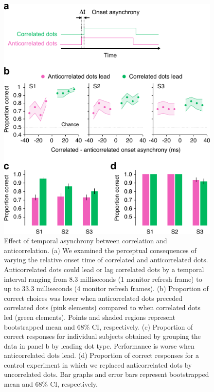\begin{figure}
  \centering
  \includegraphics{Fig6}
  \caption[Effect of temporal asynchrony between correlation and anticorrelation.]{Effect of temporal asynchrony between correlation and anticorrelation. (a) We examined the perceptual consequences of varying the relative onset time of correlated and anticorrelated dots. Anticorrelated dots could lead or lag correlated dots by a temporal interval ranging from 8.3 milliseconds (1 monitor refresh frame) to up to 33.3 milliseconds (4 monitor refresh frames). (b) Proportion of correct choices was lower when anticorrelated dots preceded correlated dots (pink elements) compared to when correlated dots led (green elements). Points and shaded regions represent bootstrapped mean and 68\% CI, respectively. (c) Proportion of correct responses for individual subjects obtained by grouping the data in panel b by leading dot type. Performance is worse when anticorrelated dots lead. (d) Proportion of correct responses for a control experiment in which we replaced anticorrelated dots by uncorrelated dots. Bar graphs and error bars represent bootstrapped mean and 68\% CI, respectively.}
  \label{fig:c2f6}
\end{figure}




